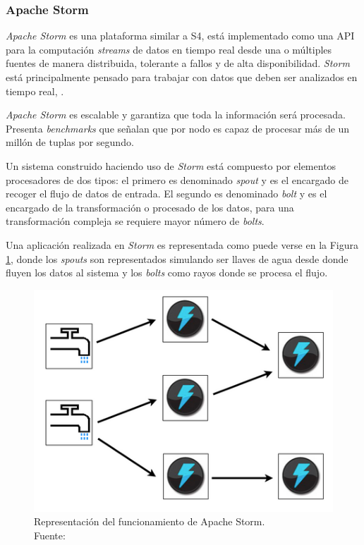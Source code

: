 \subsubsection*{Apache Storm}
\label{arte:SPS:storm}
					
\textit{Apache Storm} es una plataforma similar a S4, está implementado como una API para la computación \textit{streams} de datos en tiempo real desde una o múltiples fuentes de manera distribuida, tolerante a fallos y de alta disponibilidad. \textit{Storm} está principalmente pensado para trabajar con datos que deben ser analizados en tiempo real, \citep{Storm}.

\textit{Apache Storm} es escalable y garantiza que toda la información será procesada. Presenta \textit{benchmarks} que señalan que por nodo es capaz de procesar más de un millón de tuplas por segundo.

Un sistema construido haciendo uso de \textit{Storm} está compuesto por elementos procesadores de dos tipos: el primero es denominado \textit{spout} y es el encargado de recoger el flujo de datos de entrada. El segundo es denominado \textit{bolt} y es el encargado de la transformación o procesado de los datos, para una transformación compleja se requiere mayor número de \textit{bolts}.

Una aplicación realizada en \textit{Storm} es representada como puede verse en la Figura \ref{fig:stormBeLike}, donde los \textit{spouts} son representados simulando ser llaves de agua desde donde fluyen los datos al sistema y los \textit{bolts} como rayos donde se procesa el flujo.

\begin{figure}[H]
	\centering
	\captionsetup{justification=centering}
	\includegraphics[scale=0.6]{images/stormBeLike.png}
	\caption[Representación del funcionamiento de Apache Storm.]{Representación del funcionamiento de Apache Storm.\\Fuente: \citep{StormFigure}}
	\label{fig:stormBeLike}
\end{figure}

